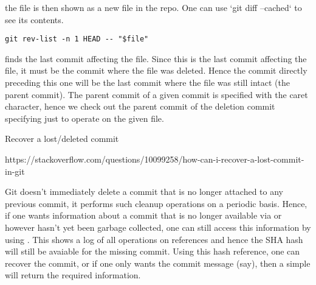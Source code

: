 \documentclass{git_course}
\begin{document}
the file is then shown as a new file in the repo.  One can use `git diff
--cached` to see its contents.

\begin{verbatim}
git rev-list -n 1 HEAD -- "$file"
\end{verbatim}

finds the last commit affecting the file.  Since this is the last commit
affecting the file, it must be the commit where the file was deleted.  Hence
the commit directly preceding this one will be the last commit where the
file was still intact (the parent commit).  The parent commit of a given
commit is specified with the caret \ttt{\^} character, hence we check out
the parent commit of the deletion commit specifying just to operate on the
given file.



Recover a lost/deleted commit

https://stackoverflow.com/questions/10099258/how-can-i-recover-a-lost-commit-in-git

Git doesn't immediately delete a commit that is no longer attached to any
previous commit, it performs such cleanup operations on a periodic basis.
Hence, if one wants information about a commit that is no longer available
via  or  however hasn't yet been garbage collected,
one can still access this information by using .  This shows
a log of all operations on references and hence the SHA hash will still be
avaiable for the missing commit.  Using this hash reference, one can recover
the commit, or if one only wants the commit message (say), then a simple
 will return the required information.
\end{document}

